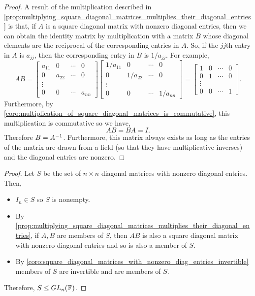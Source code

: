 \documentclass[MathsNotesBase.tex]{subfiles}
\begin{document}
{\begin{corollary}
		\end{corollary}
		\begin{proof}
			A result of the multiplication described in \autoref{prop:multiplying_square_diagonal_matrices_multiplies_their_diagonal_entries} is that, if $A$ is a square diagonal matrix with nonzero diagonal entries, then we can obtain the identity matrix by multiplication with a matrix $B$ whose diagonal elements are the reciprocal of the corresponding entries in $A$. So, if the $jj$th entry in $A$ is $a_{jj}$, then the corresponding entry in $B$ is $1/a_{jj}$. For example,
			\[ 	AB = 
				\begin{bmatrix}
				a_{11} & 0      & \cdots & 0\\
				0 	   & a_{22} & \cdots & 0\\
				\vdots\\
				0 	   & 0 	    & \cdots & a_{nn}
				\end{bmatrix}
				\begin{bmatrix}
				1/a_{11} & 0        & \cdots & 0\\
				0 	     & 1/a_{22} & \cdots & 0\\
				\vdots\\
				0 	     & 0 	    & \cdots & 1/a_{nn}
				\end{bmatrix} =
				\begin{bmatrix}
				1 & 0 & \cdots & 0\\
				0 & 1 & \cdots & 0\\
				\vdots\\
				0 & 0 & \cdots & 1
				\end{bmatrix}.
			\]
			Furthermore, by \ref{coro:multiplication_of_square_diagonal_matrices_is_commutative}, this multiplication is commutative so we have,
			\[ AB = BA = I. \]
			Therefore ${ B = {A}^{-1} }$. Furthermore, this matrix always exists as long as the entries of the matrix are drawn from a field (so that they have multiplicative inverses) and the diagonal entries are nonzero.
		\end{proof}
		
		
		\bigskip
		\begin{proof}
			Let $S$ be the set of ${ n \times n }$ diagonal matrices with nonzero diagonal entries. Then,
			\begin{itemize}
				\item{${ I_n \in S }$ so $S$ is nonempty.}
				\item{By \autoref{prop:multiplying_square_diagonal_matrices_multiplies_their_diagonal_entries}, if $A,B$ are members of $S$, then $AB$ is also a square diagonal matrix with nonzero diagonal entries and so is also a member of $S$.}
				\item{By \ref{coro:square_diagonal_matrices_with_nonzero_diag_entries_invertible} members of $S$ are invertible and are members of $S$.}
			\end{itemize}
			Therefore, ${ S \leq GL_n(\mathbb{F}^{}) }$.
		\end{proof}
	}
\end{document}
